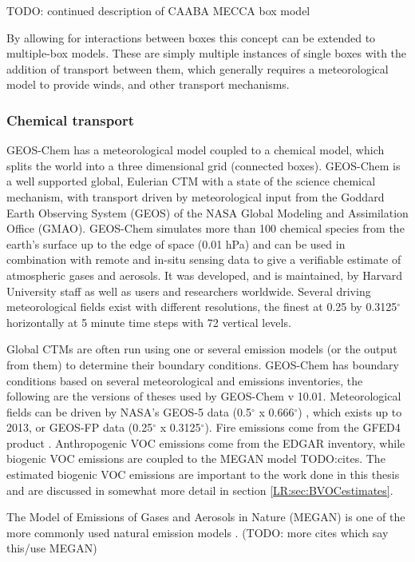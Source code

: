       TODO: continued description of CAABA MECCA box model
    
      By allowing for interactions between boxes this concept can be extended to multiple-box models.
      These are simply multiple instances of single boxes with the addition of transport between them, which generally requires a meteorological model to provide winds, and other transport mechanisms.
      
    \subsubsection{Chemical transport} %
      GEOS-Chem has a meteorological model coupled to a chemical model, which splits the world into a three dimensional grid (connected boxes).
      GEOS-Chem is a well supported global, Eulerian CTM with a state of the science chemical mechanism, with transport driven by meteorological input from the Goddard Earth Observing System (GEOS) of the NASA Global Modeling and Assimilation Office (GMAO).
      GEOS-Chem simulates more than 100 chemical species from the earth's surface up to the edge of space (0.01 hPa) and can be used in combination with remote and in-situ sensing data to give a verifiable estimate of atmospheric gases and aerosols.
      It was developed, and is maintained, by Harvard University staff as well as users and researchers worldwide. 
      Several driving meteorological fields exist with different resolutions, the finest at 0.25 by 0.3125$^\circ$ horizontally at 5 minute time steps with 72 vertical levels.
      
      Global CTMs are often run using one or several emission models (or the output from them) to determine their boundary conditions.
      GEOS-Chem has boundary conditions based on several meteorological and emissions inventories, the following are the versions of theses used by GEOS-Chem v 10.01. 
      Meteorological fields can be driven by NASA's GEOS-5 data (0.5$^{\circ}$ x 0.666$^{\circ}$) \citep{Chen2009}, which exists up to 2013, or GEOS-FP data (0.25$^{\circ}$ x 0.3125$^{\circ}$).
      Fire emissions come from the GFED4 product \citep{Giglio2013}. 
      Anthropogenic VOC emissions come from the EDGAR inventory, while biogenic VOC emissions are coupled to the MEGAN model TODO:cites.
      The estimated biogenic VOC emissions are important to the work done in this thesis and are discussed in somewhat more detail in section \ref{LR:sec:BVOCestimates}.
      
      The Model of Emissions of Gases and Aerosols in Nature (MEGAN) is one of the more commonly used natural emission models \citep{Monks2015}. (TODO: more cites which say this/use MEGAN)
      
